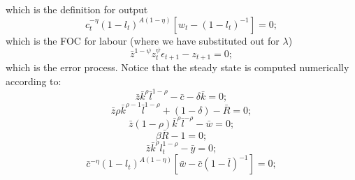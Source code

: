 \documentclass[a4paper,11pt]{article}
\begin{document}
which is the definition for output
\begin{equation}
c_t^{-\eta}\left(1-l_t\right)^{A\left(1-\eta\right)}\left[w_t-\left(1-l_t\right)^{-1}\right]=0;
\end{equation}
which is the FOC for labour (where we have substituted out for $\lambda$)
\begin{equation}
\bar{z}^{1-\psi}z_t^\psi\epsilon_{t+1}-z_{t+1}=0;
\end{equation}
which is the error process. Notice that the steady state is computed numerically according to:
\[\bar{z}\bar{k}^\rho\bar{l}^{1-\rho}-\bar{c}-\delta\bar{k}=0;\]
\[\bar{z}\rho\bar{k}^{\rho-1}\bar{l}^{1-\rho}+\left(1-\delta\right)-\bar{R}=0;\]
\[\bar{z}\left(1-\rho\right)\bar{k}^\rho\bar{l}^{-\rho}-\bar{w}=0;\]
\[\beta\bar{R}-1=0;\]
\[\bar{z}\bar{k}^\rho l_t^{1-\rho}-\bar{y}=0;\]
\[\bar{c}^{-\eta}\left(1-l_t\right)^{A\left(1-\eta\right)}\left[\bar{w}-\bar{c}\left(1-\bar{l}\right)^{-1}\right]=0;\]
\end{document}
